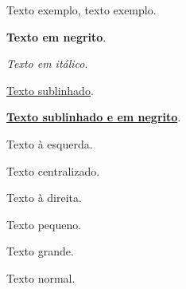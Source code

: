 \documentclass[12pt]{article}
\begin{document}
	Texto exemplo, texto exemplo.
	
	\textbf{Texto em negrito}.
	
	\textit{Texto em itálico}.
	
	\underline{Texto sublinhado}.
	
	\underline{\textbf{Texto sublinhado e em negrito}}.
	
	\begin{flushleft}
		Texto à esquerda.
	\end{flushleft}
	
	\begin{center}
		Texto centralizado.
	\end{center}
	
	\begin{flushright}
		Texto à direita.
	\end{flushright}
	
	{\tiny Texto pequeno.}
	
	{\Huge Texto grande.}
	
	Texto normal.
\end{document}
